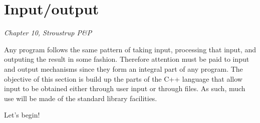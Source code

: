 \section{Input/output}
\label{sec:inputoutput}

\textit{Chapter 10, Stroustrup P\&P}

Any program follows the same pattern of taking input, processing that
input, and outputing the result in some fashion. Therefore attention
must be paid to input and output mechanisms since they form an
integral part of any program. The objective of this section is build
up the parts of the C++ language that allow input to be obtained
either through user input or through files. As such, much use will be
made of the standard library facilities. 

Let's begin!



